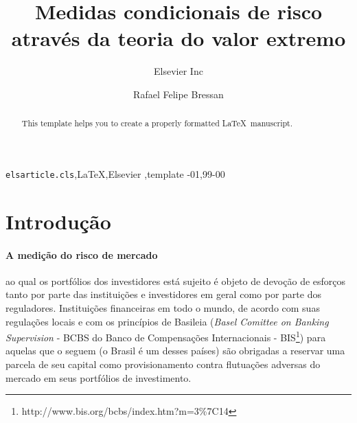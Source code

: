 \documentclass[review]{elsarticle}
\theoremstyle{definition}
\begin{document}
\begin{frontmatter}

\title{Medidas condicionais de risco através da teoria do valor extremo}


\author[mymainaddress,mysecondaryaddress]{Elsevier Inc}

\author[mymainaddress]{Rafael Felipe Bressan}

\address[mymainaddress]{Avenida Madre Benvenuta, 2007 - Santa Mônica Florianópolis - SC 88035-901}
\address[mysecondaryaddress]{360 Park Avenue South, New York}

\begin{abstract}
This template helps you to create a properly formatted \LaTeX\ manuscript.
\end{abstract}

\begin{keyword}
\texttt{elsarticle.cls}\sep \LaTeX\sep Elsevier \sep template
-01\sep  99-00
\end{keyword}

\end{frontmatter}

\linenumbers

\section{Introdução}

\paragraph{A medição do risco de mercado} ao qual os portfólios dos investidores está sujeito é objeto de devoção de esforços tanto por parte das instituições e investidores em geral como por parte dos reguladores. Instituições financeiras em todo o mundo, de acordo com suas regulações locais e com os princípios de Basileia (\emph{Basel Comittee on Banking Supervision} - BCBS do Banco de Compensações Internacionais - BIS\footnote{http://www.bis.org/bcbs/index.htm?m=3\%7C14}) para aquelas que o seguem (o Brasil é um desses países)  são obrigadas a reservar uma parcela de seu capital como provisionamento contra flutuações adversas do mercado em seus portfólios de investimento.
\end{document}
